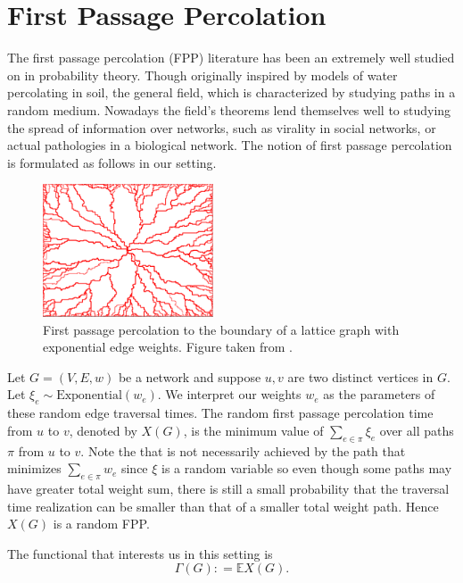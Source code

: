 \chapter{First Passage Percolation}



The first passage percolation (FPP) literature has been an extremely well studied on in probability theory.  Though originally inspired by models of water percolating in soil, the general field, which is characterized by studying paths in a random medium.  Nowadays the field's theorems lend themselves well to studying the spread of information over networks, such as virality in social networks, or actual pathologies in a biological network.  The notion of first passage percolation is formulated as follows in our setting.  

\begin{figure}[h]
\begin{center}
  \includegraphics[width=0.45\textwidth]{fpp.png}
   \caption{First passage percolation to the boundary of a lattice graph with exponential edge weights. Figure taken from \cite{wiki}.}
 \end{center}
\end{figure}

Let $G = (V, E, w)$ be a network and suppose $u, v$ are two distinct vertices in $G$.  Let $\xi_e \sim \text{Exponential}(w_e)$. We interpret our weights $w_e$ as the parameters of these random edge traversal times.  The random first passage percolation time from $u$ to $v$, denoted by $X(G)$, is the minimum value of $\sum_{e\in \pi}\xi_e$ over all paths $\pi$ from $u$ to $v$.  Note the that is not necessarily achieved by the path that minimizes $\sum_{e\in \pi}w_e$ since $\xi$ is a random variable so even though some paths may have greater total weight sum, there is still a small probability that the traversal time realization can be smaller than that of a smaller total weight path.  Hence $X(G)$ is a random FPP.  

The functional that interests us in this setting is $$ \Gamma(G) : = \mathbb{E}X(G).$$

